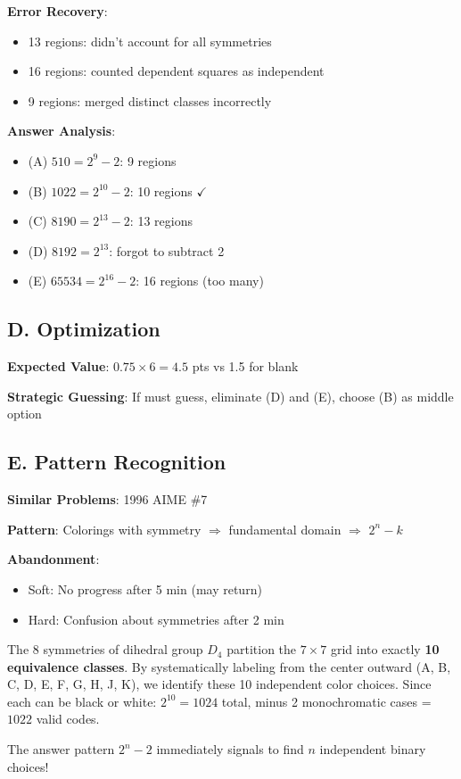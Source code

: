 \documentclass[]{article}
\begin{document}
\begin{competitionbox}
\textbf{Error Recovery}:
\begin{itemize}[nosep]
    \item 13 regions: didn't account for all symmetries
    \item 16 regions: counted dependent squares as independent
    \item 9 regions: merged distinct classes incorrectly
\end{itemize}

\textbf{Answer Analysis}:
\begin{itemize}[nosep]
    \item (A) $510 = 2^9 - 2$: 9 regions
    \item (B) $1022 = 2^{10} - 2$: 10 regions $\checkmark$
    \item (C) $8190 = 2^{13} - 2$: 13 regions
    \item (D) $8192 = 2^{13}$: forgot to subtract 2
    \item (E) $65534 = 2^{16} - 2$: 16 regions (too many)
\end{itemize}

\subsection*{D. Optimization}

\textbf{Expected Value}: $0.75 \times 6 = 4.5$ pts vs 1.5 for blank

\textbf{Strategic Guessing}: If must guess, eliminate (D) and (E), choose (B) as middle option

\subsection*{E. Pattern Recognition}

\textbf{Similar Problems}: 1996 AIME \#7

\textbf{Pattern}: Colorings with symmetry $\Rightarrow$ fundamental domain $\Rightarrow$ $2^n - k$

\textbf{Abandonment}:
\begin{itemize}[nosep]
    \item Soft: No progress after 5 min (may return)
    \item Hard: Confusion about symmetries after 2 min
\end{itemize}
\end{competitionbox}

\begin{keyinsightbox}
The 8 symmetries of dihedral group $D_4$ partition the $7 \times 7$ grid into exactly \textbf{10 equivalence classes}. By systematically labeling from the center outward (A, B, C, D, E, F, G, H, J, K), we identify these 10 independent color choices. Since each can be black or white: $2^{10} = 1024$ total, minus 2 monochromatic cases = $\boxed{1022}$ valid codes.

The answer pattern $2^n - 2$ immediately signals to find $n$ independent binary choices!
\end{keyinsightbox}
\end{document}
